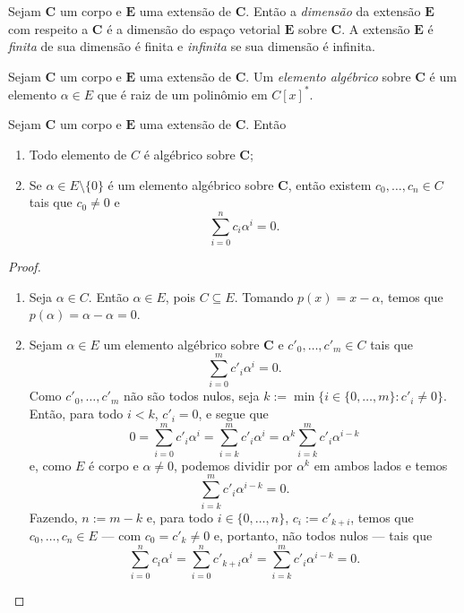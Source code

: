 \begin{definition}
	Sejam $\bm C$ um corpo e $\bm E$ uma extensão de $\bm C$. Então a \emph{dimensão} da extensão $\bm E$ com respeito a $\bm C$ é a dimensão do espaço vetorial $\bm E$ sobre $\bm C$. A extensão $\bm E$ é \emph{finita} de sua dimensão é finita e \emph{infinita} se sua dimensão é infinita.
\end{definition}

\begin{definition}
	Sejam $\bm C$ um corpo e $\bm E$ uma extensão de $\bm C$. Um \emph{elemento algébrico} sobre $\bm C$ é um elemento $\alpha \in E$ que é raiz de um polinômio em $C[x]^*$.
\end{definition}

\begin{proposition}
	Sejam $\bm C$ um corpo e $\bm E$ uma extensão de $\bm C$. Então
	\begin{enumerate}
	\item Todo elemento de $C$ é algébrico sobre $\bm C$;
	\item Se $\alpha \in E \setminus \{0\}$ é um elemento algébrico sobre $\bm C$, então existem $c_0,\ldots,c_n \in C$ tais que $c_0 \neq 0$ e
	\begin{equation*}
	\sum_{i=0}^n c_i\alpha^i = 0.
	\end{equation*}
	\end{enumerate}
\end{proposition}
\begin{proof}
	\begin{enumerate}
	\item Seja $\alpha \in C$. Então $\alpha \in E$, pois $C \subseteq E$. Tomando $p(x)=x-\alpha$, temos que $p(\alpha)=\alpha-\alpha=0$.
	\item Sejam $\alpha \in E$ um elemento algébrico sobre $\bm C$ e $c'_0,\ldots,c'_m \in C$ tais que
	\begin{equation*}
	\sum_{i=0}^m c'_i\alpha^i = 0.
	\end{equation*}
Como $c'_0, \ldots,c'_m$ não são todos nulos, seja $k := \min\{i \in \{0,\ldots,m\} : c'_i \neq 0\}$. Então, para todo $i < k$, $c'_i = 0$, e segue que
	\begin{equation*}
	0 = \sum_{i=0}^m c'_i\alpha^i = \sum_{i=k}^m c'_i\alpha^i = \alpha^k \sum_{i=k}^m c'_i\alpha^{i-k}
	\end{equation*}
e, como $E$ é corpo e $\alpha \neq 0$, podemos dividir por $\alpha^k$ em ambos lados e temos
	\begin{equation*}
	\sum_{i=k}^m c'_i\alpha^{i-k} = 0.
	\end{equation*}
Fazendo, $n := m-k$ e, para todo $i \in \{0,\ldots,n\}$, $c_i := c'_{k+i}$, temos que $c_0,\ldots,c_n \in E$ — com $c_0 = c'_k \neq 0$ e, portanto, não todos nulos — tais que
	\begin{equation*}
	\sum_{i=0}^n c_i\alpha^i = \sum_{i=0}^n c'_{k+i}\alpha^i = \sum_{i=k}^m c'_i\alpha^{i-k} = 0.
	\end{equation*}
	\end{enumerate}
\end{proof}

